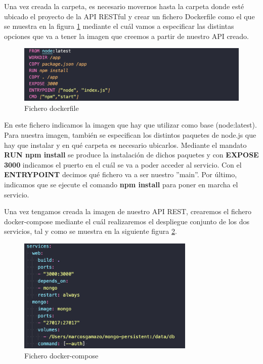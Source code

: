 Una vez creada la carpeta, es necesario movernos hasta la carpeta donde esté ubicado el proyecto de la API RESTful y crear un fichero Dockerfile como el que se muestra en la figura \ref{fig:dockerfile} mediante el cuál vamos a especificar las distintas opciones que va a tener la imagen que creemos a partir de nuestro API creado.

\begin{figure}[H]
    \centering
    \includegraphics[width=\textwidth]{include/capturas/Dockerfile.png}
    \caption{Fichero dockerfile}
    \label{fig:dockerfile}
\end{figure}

En este fichero indicamos la imagen que hay que utilizar como base (node:latest). Para nuestra imagen, también se especifican los distintos paquetes de node.js que hay que instalar y en qué carpeta es necesario ubicarlos. Mediante el mandato \textbf{RUN npm install} se produce la instalación de dichos paquetes y con \textbf{EXPOSE 3000} indicamos el puerto en el cuál se va a poder acceder al servicio. Con el \textbf{ENTRYPOINT} decimos qué fichero va a ser nuestro ''main''. Por último, indicamos que se ejecute el comando \textbf{npm install} para poner en marcha el servicio. 

Una vez tengamos creada la imagen de nuestro API REST, crearemos el fichero docker-compose \cite{dockerCompose} mediante el cuál realizaremos el despliegue conjunto de los dos servicios, tal y como se muestra en la siguiente figura \ref{fig:docker-compose}.

\begin{figure}[H]
    \centering
    \includegraphics[width=0.75\textwidth]{include/capturas/DockerCompose.png}
    \caption{Fichero docker-compose}
    \label{fig:docker-compose}
\end{figure}

